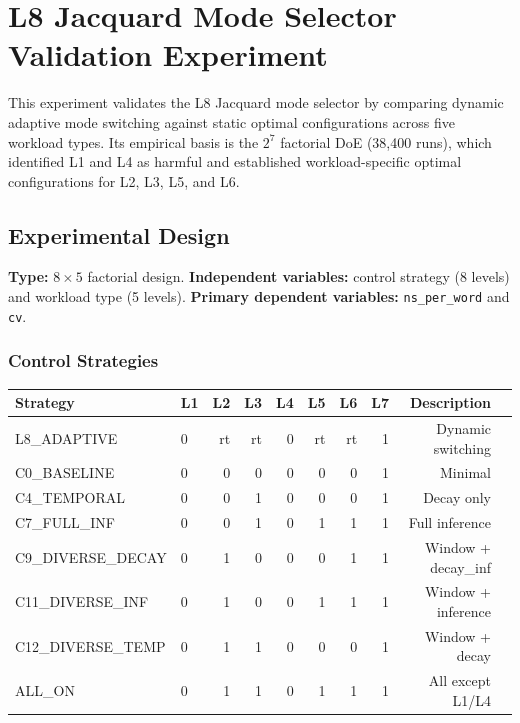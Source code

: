
\section{L8 Jacquard Mode Selector Validation Experiment}

This experiment validates the L8 Jacquard mode selector by comparing
dynamic adaptive mode switching against static optimal configurations across
five workload types. Its empirical basis is the $2^7$ factorial DoE
(38{,}400 runs), which identified L1 and L4 as harmful and established
workload-specific optimal configurations for L2, L3, L5, and L6.


\subsection{Experimental Design}

\textbf{Type:} $8 \times 5$ factorial design.
\textbf{Independent variables:} control strategy (8 levels) and workload
type (5 levels). \textbf{Primary dependent variables:} \texttt{ns\_per\_word}
and \texttt{cv}.

\subsubsection{Control Strategies}

\begin{center}
\begin{tabular}{llrrrrrrrl}
\toprule
Strategy & L1 & L2 & L3 & L4 & L5 & L6 & L7 & Description \\
\midrule
L8\_ADAPTIVE       & 0 & rt & rt & 0 & rt & rt & 1 & Dynamic switching \\
C0\_BASELINE       & 0 &  0 &  0 & 0 &  0 &  0 & 1 & Minimal \\
C4\_TEMPORAL       & 0 &  0 &  1 & 0 &  0 &  0 & 1 & Decay only \\
C7\_FULL\_INF      & 0 &  0 &  1 & 0 &  1 &  1 & 1 & Full inference \\
C9\_DIVERSE\_DECAY & 0 &  1 &  0 & 0 &  0 &  1 & 1 & Window + decay\_inf \\
C11\_DIVERSE\_INF  & 0 &  1 &  0 & 0 &  1 &  1 & 1 & Window + inference \\
C12\_DIVERSE\_TEMP & 0 &  1 &  1 & 0 &  0 &  0 & 1 & Window + decay \\
ALL\_ON            & 0 &  1 &  1 & 0 &  1 &  1 & 1 & All except L1/L4 \\
\bottomrule
\end{tabular}
\end{center}

